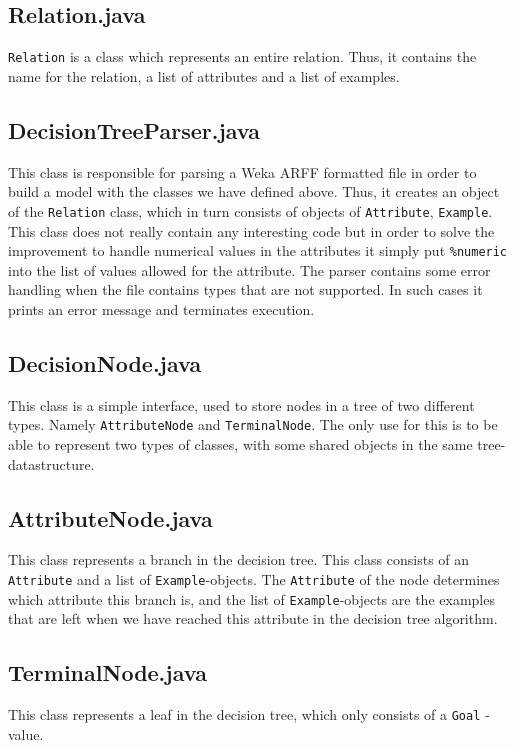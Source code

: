 \documentclass[a4paper]{article}
\begin{document}
\subsection{Relation.java}
\texttt{Relation} is a class which represents an entire relation. Thus, it contains the name for the relation, a list of attributes and a list of examples.
\subsection{DecisionTreeParser.java}
This class is responsible for parsing a Weka ARFF formatted file in order to build a model with the classes we have defined above. Thus, it creates an object of the \texttt{Relation} class, which in turn consists of objects of \texttt{Attribute}, \texttt{Example}. This class does not really contain any interesting code but in order to solve the improvement to handle numerical values in the attributes it simply put \texttt{\%numeric} into the list of values allowed for the attribute. The parser contains some error handling when the file contains types that are not supported. In such cases it prints an error message and terminates execution.
\subsection{DecisionNode.java}
This class is a simple interface, used to store nodes in a tree of two different types. Namely \texttt{AttributeNode} and \texttt{TerminalNode}. The only use for this is to be able to represent two types of classes, with some shared objects in the same tree-datastructure.
\subsection{AttributeNode.java}
This class represents a branch in the decision tree. This class consists of an \texttt{Attribute} and a list of \texttt{Example}-objects. The \texttt{Attribute} of the node determines which attribute this branch is, and the list of \texttt{Example}-objects are the examples that are left when we have reached this attribute in the decision tree algorithm. 
\subsection{TerminalNode.java}
This class represents a leaf in the decision tree, which only consists of a \texttt{Goal} - value. 
\end{document}
